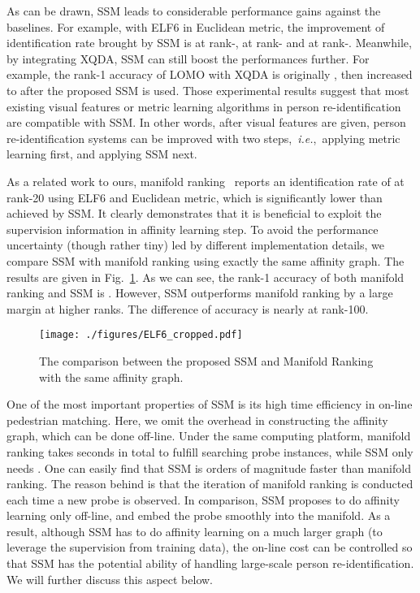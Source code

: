 \documentclass[10pt,twocolumn,letterpaper]{article}
\def\ie{\emph{i.e.}}
\begin{document}
As can be drawn, SSM leads to considerable performance gains against the baselines. For example, with ELF6 in Euclidean metric, the improvement of identification rate brought by SSM is  at rank-,  at rank- and  at rank-. Meanwhile, by integrating XQDA, SSM can still boost the performances further. For example, the rank-1 accuracy of LOMO with XQDA is originally , then increased to  after the proposed SSM is used.
Those experimental results suggest that most existing visual features or metric learning algorithms in person re-identification are compatible with SSM. In other words, after visual features are given, person re-identification systems can be improved with two steps,~\ie,~applying metric learning first, and applying SSM next.

As a related work to ours, manifold ranking~\cite{person_manifold_ranking} reports an identification rate of  at rank-20 using ELF6 and Euclidean metric, which is significantly lower than  achieved by SSM. It clearly demonstrates that it is beneficial to exploit the supervision information in affinity learning step. To avoid the performance uncertainty (though rather tiny) led by different implementation details, we compare SSM with manifold ranking using exactly the same affinity graph. The results are given in Fig.~\ref{fig:ELF6}. As we can see, the rank-1 accuracy of both manifold ranking and SSM is . However, SSM outperforms manifold ranking by a large margin at higher ranks. The difference of accuracy is nearly  at rank-100.
\begin{figure}[tb]
\centering
\texttt{[image: ./figures/ELF6\_cropped.pdf]}
\caption{The comparison between the proposed SSM and Manifold Ranking with the same affinity graph.}
\label{fig:ELF6}
\vspace{-2ex}
\end{figure}

One of the most important properties of SSM is its high time efficiency in on-line pedestrian matching. Here, we omit the overhead in constructing the affinity graph, which can be done off-line. Under the same computing platform, manifold ranking takes  seconds in total to fulfill searching  probe instances, while SSM only needs . One can easily find that SSM is  orders of magnitude faster than manifold ranking. The reason behind is that the iteration of manifold ranking is conducted each time a new probe is observed. In comparison, SSM proposes to do affinity learning only off-line, and embed the probe smoothly into the manifold. As a result, although SSM has to do affinity learning on a much larger graph (to leverage the supervision from training data), the on-line cost can be controlled so that SSM has the potential ability of handling large-scale person re-identification. We will further discuss this aspect below.
\end{document}
